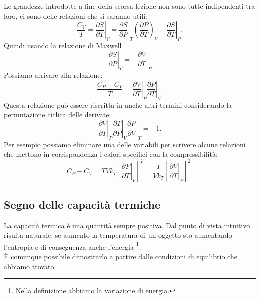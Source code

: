 Le grandezze introdotte a fine della scorsa lezione non sono tutte indipendenti tra loro, ci sono delle relazioni che si saranno utili:
\[
	\frac{C_{V}}{T}= \left.\frac{\partial S}{\partial T} \right|_{V}= \left.\frac{\partial S}{\partial P} \right|_{T} \left( \frac{\partial P}{\partial T}  \right) _{V} + \left.\frac{\partial S}{\partial T} \right|_{P}
.\] 
Quindi usando la relazione di Maxwell
\[
	\left.\frac{\partial S}{\partial P} \right|_{T}= - \left.\frac{\partial V}{\partial T} \right|_{P}
\]
Possiamo arrivare alla relazione:
\[
	 \frac{C_{P}- C_{V}}{T}= \left.\frac{\partial V}{\partial T} \right|_{P} \left.\frac{\partial P}{\partial T} \right|_{V}
.\] 
Questa relazione può essere riscritta in anche altri termini considerando la permutazione ciclica delle derivate:
\[
	\left.\frac{\partial V}{\partial T} \right|_{P} \left.\frac{\partial T}{\partial P} \right|_{V} \left.\frac{\partial P}{\partial V} \right|_{T} = -1
.\] 
Per esempio possiamo eliminare una delle variabili per scrivere alcune relazioni che mettono in corrispondenza i calori specifici con la compressibilità:
\[
	C_{P}- C_{V}= TVk_{T} \left[ \left.\frac{\partial P}{\partial T} \right|_{V} \right] ^2 
		= \frac{T}{V k_{T}} \left[ \left.\frac{\partial V}{\partial T} \right|_{P} \right]^2
.\]
\subsection{Segno delle capacità termiche}%
La capacità termica è una quantità sempre positiva. Dal punto di vista intuitivo risulta naturale: se aumento la temperatura di un oggetto sto aumentando l'entropia e di conseguenza anche l'energia \footnote{Nella definizione abbiamo la variazione di energia.}.\\
È comunque possibile dimostrarlo a partire dalle condizioni di equilibrio che abbiamo trovato. 
